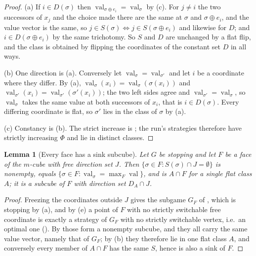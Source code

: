 \documentclass[11pt]{article}
\theoremstyle{plain}
\newtheorem{lemma}[theorem]{Lemma}
\theoremstyle{definition}
\DeclareMathOperator{\val}{val}
\begin{document}
\begin{proof}
(a) If $i\in D(\sigma)$ then $\val_{\sigma\oplus e_i}=\val_\sigma$ by
(c). For $j\ne i$ the two successors of $x_j$ and the
choice made there are the same at $\sigma$ and $\sigma\oplus e_i$, and the
value vector is the same, so $j\in S(\sigma)\Leftrightarrow j\in S(\sigma\oplus e_i)$
and likewise for $D$; and $i\in D(\sigma\oplus e_i)$ by the same trichotomy.
So $S$ and $D$ are unchanged by a flat flip, and the class is obtained by
flipping the coordinates of the constant set $D$ in all ways.

(b) One direction is (a). Conversely let $\val_\sigma=\val_{\sigma'}$ and let
$i$ be a coordinate where they differ. By (a),
$\val_\sigma(x_i)=\val_\sigma(\sigma(x_i))$ and
$\val_{\sigma'}(x_i)=\val_{\sigma'}(\sigma'(x_i))$; the two left sides agree
and $\val_{\sigma'}=\val_\sigma$, so $\val_\sigma$ takes the same value at
both successors of $x_i$, that is $i\in D(\sigma)$. Every differing
coordinate is flat, so $\sigma'$ lies in the class of $\sigma$ by (a).

(c) Constancy is (b). The strict increase is ; the run's
strategies therefore have strictly increasing $\Phi$ and lie in distinct
classes.
\end{proof}

\begin{lemma}[Every face has a sink subcube]\label{lem:face-sink}
Let $G$ be stopping and let $F$ be a face of the $m$-cube with free direction
set $J$. Then $\{\sigma\in F:S(\sigma)\cap J=\emptyset\}$ is nonempty, equals
$\{\sigma\in F:\val_\sigma=\max_{F}\val\}$, and is $A\cap F$ for a single
flat class $A$; it is a subcube of $F$ with direction set $D_A\cap J$.
\end{lemma}

\begin{proof}
Freezing the coordinates outside $J$ gives the subgame $G_F$ of
, which is stopping by (a), and by
(e) a point of $F$ with no strictly switchable free
coordinate is exactly a strategy of $G_F$ with no strictly switchable
vertex, i.e.\ an optimal one (). By
 those form a nonempty subcube, and they all carry the
same value vector, namely that of $G_F$; by (b) they
therefore lie in one flat class $A$, and conversely every member of $A\cap F$
has the same $S$, hence is also a sink of $F$.
\end{proof}
\end{document}
